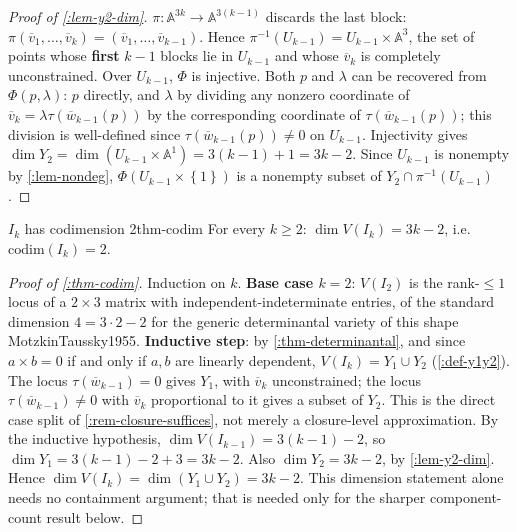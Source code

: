 \documentclass[a4paper,11pt]{scrartcl}
\begin{document}
\begin{proof}[Proof of \cref{:lem-y2-dim}] \(\pi:\mathbb{A}^{3k} \rightarrow \mathbb{A}^{3(k - 1)}\) discards the last block: \(\pi({\overline{v}}_{1},\ldots,{\overline{v}}_{k}) = \left( {\overline{v}}_{1},\ldots,{\overline{v}}_{k - 1} \right)\). Hence \(\pi^{- 1}\left( U_{k - 1} \right) = U_{k - 1} \times \mathbb{A}^{3}\), the set of points whose \textbf{first} \(k - 1\) blocks lie in \(U_{k - 1}\) and whose \({\overline{v}}_{k}\) is completely unconstrained. Over \(U_{k - 1}\), \(\Phi\) is injective. Both \(p\) and \(\lambda\) can be recovered from \(\Phi(p,\lambda)\): \(p\) directly, and \(\lambda\) by dividing any nonzero coordinate of \({\overline{v}}_{k} = \lambda\tau({\overline{w}}_{k - 1}(p))\) by the corresponding coordinate of \(\tau({\overline{w}}_{k - 1}(p))\); this division is well-defined since \(\tau({\overline{w}}_{k - 1}(p)) \neq 0\) on \(U_{k - 1}\). Injectivity gives \(\dim Y_{2} = \dim\left( U_{k - 1} \times \mathbb{A}^{1} \right) = 3(k - 1) + 1 = 3k - 2\). Since \(U_{k - 1}\) is nonempty by \cref{:lem-nondeg}, \(\Phi(U_{k - 1} \times \left\{ 1 \right\})\) is a nonempty subset of \(Y_{2} \cap \pi^{- 1}\left( U_{k - 1} \right)\).

\end{proof}

\begin{theorem}{{}\(I_{k}\) has codimension 2}{thm-codim} For every \(k \geq 2\): \(\dim V\left( I_{k} \right) = 3k - 2\), i.e. \(\text{codim}\left( I_{k} \right) = 2\).

\end{theorem} \protect{}\label{thm-codim}{}

\begin{proof}[Proof of \cref{:thm-codim}] Induction on \(k\). \textbf{Base case \(k = 2\)}: \(V\left( I_{2} \right)\) is the rank-\(\leq 1\) locus of a \(2 \times 3\) matrix with independent-indeterminate entries, of the standard dimension \(4 = 3 \cdot 2 - 2\) for the generic determinantal variety of this shape MotzkinTaussky1955. \textbf{Inductive step}: by \cref{:thm-determinantal}, and since \(a \times b = 0\) if and only if \(a,b\) are linearly dependent, \(V\left( I_{k} \right) = Y_{1} \cup Y_{2}\) (\cref{:def-y1y2}). The locus \(\tau({\overline{w}}_{k - 1}) = 0\) gives \(Y_{1}\), with \({\overline{v}}_{k}\) unconstrained; the locus \(\tau({\overline{w}}_{k - 1}) \neq 0\) with \({\overline{v}}_{k}\) proportional to it gives a subset of \(Y_{2}\). This is the direct case split of \cref{:rem-closure-suffices}, not merely a closure-level approximation. By the inductive hypothesis, \(\dim V\left( I_{k - 1} \right) = 3(k - 1) - 2\), so \(\dim Y_{1} = 3(k - 1) - 2 + 3 = 3k - 2\). Also \(\dim Y_{2} = 3k - 2\), by \cref{:lem-y2-dim}. Hence \(\dim V\left( I_{k} \right) = \dim(Y_{1} \cup Y_{2}) = 3k - 2\). This dimension statement alone needs no containment argument; that is needed only for the sharper component-count result below.

\end{proof}
\end{document}
